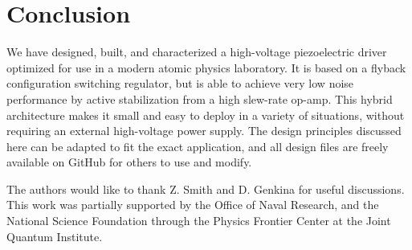 \documentclass[aip,rsi,reprint]{revtex4-1} %
\begin{document}
\section{Conclusion}
\label{Sec:Conclusion}

We have designed, built, and characterized a high-voltage piezoelectric driver optimized for use in a modern atomic physics laboratory.
It is based on a flyback configuration switching regulator, but is able to achieve very low noise performance by active stabilization from a high slew-rate op-amp.
This hybrid architecture makes it small and easy to deploy in a variety of situations, without requiring an external high-voltage power supply.
The design principles discussed here can be adapted to fit the exact application, and all design files are freely available on GitHub for others to use and modify.

\begin{acknowledgments}
The authors would like to thank Z. Smith and D. Genkina for useful discussions.
This work was partially supported by the Office of Naval Research, and the National Science Foundation through the Physics Frontier Center at the Joint Quantum Institute.
\end{acknowledgments}


\end{document}
